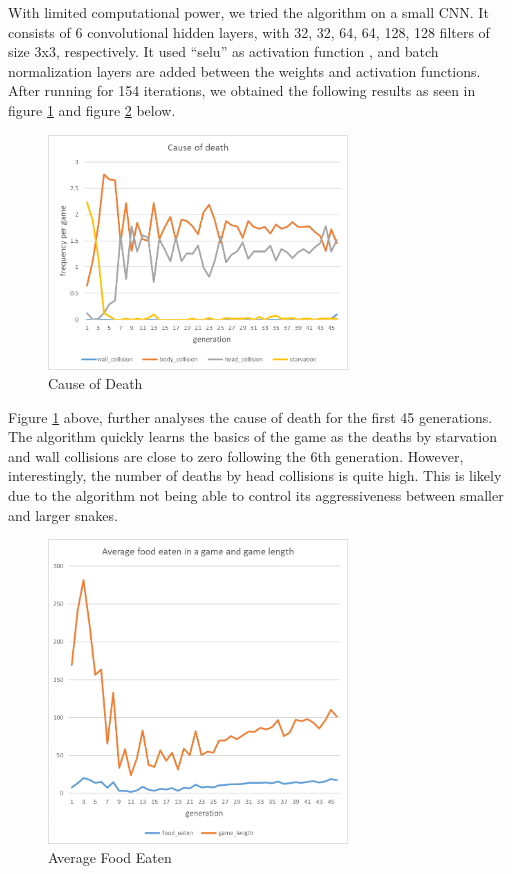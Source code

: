 ﻿\documentclass{article}
\begin{document}
With limited computational power, we tried the algorithm on a small CNN. It
consists of 6 convolutional hidden layers, with 32, 32, 64, 64, 128, 128 filters
of size 3x3, respectively. It used “selu” as activation function
\cite{SeluPaper}, and batch normalization layers are added between the weights
and activation functions. After running for 154 iterations, we obtained the
following results as seen in figure \ref{fig:cause_of_death} and figure
\ref{fig:average_food_eaten} below.

\begin{figure}[!ht]
  \centering
  \includegraphics[width=300px]{cause_of_death}
  \caption{Cause of Death}
  \label{fig:cause_of_death}
\end{figure}

\FloatBarrier

Figure \ref{fig:cause_of_death} above, further analyses the cause of death for
the first 45 generations. The algorithm quickly learns the basics of the game as
the deaths by starvation and wall collisions are close to zero following the 6th
generation.  However, interestingly, the number of deaths by head collisions is
quite high.  This is likely due to the algorithm not being able to control its
aggressiveness between smaller and larger snakes.

\begin{figure}[!ht]
  \centering
  \includegraphics[width=300px]{average_food_eaten}
  \caption{Average Food Eaten}
  \label{fig:average_food_eaten}
\end{figure}
\end{document}
